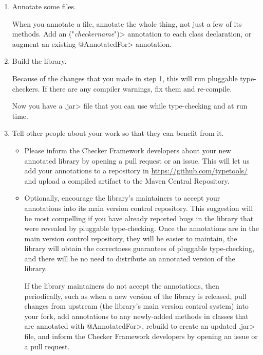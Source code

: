 \begin{enumerate}
\item Annotate some files.

  When you annotate a file, annotate the whole thing, not just a few of its
  methods.  Add an
  \<(\ttlcb"\emph{checkername}"\ttrcb)>
  annotation to each class declaration, or augment an existing \<@AnnotatedFor>
  annotation.

\item
  Build the library.

  Because of the changes that you made in step 1, this will run pluggable
  type-checkers.  If there are any compiler warnings, fix them and re-compile.

  Now you have a \<.jar> file that you can use while type-checking and at
  run time.

\item
  Tell other people about your work so that they can benefit from it.

  \begin{itemize}
  \item
    Please inform the Checker Framework developers
    about your new annotated library by opening a pull request or an issue.
    This will let us add your annotations to a repository in
    \url{https://github.com/typetools/} and upload a compiled artifact to
    the Maven Central Repository.

  \item
    Optionally, encourage the library's maintainers to accept your annotations into its
    main version control repository.  This suggestion will be most
    compelling if you have already reported bugs in the library that were
    revealed by pluggable type-checking.  Once the annotations are in the
    main version control repository, they will be easier
    to maintain, the library will obtain the correctness guarantees of
    pluggable type-checking, and there will be no need
    to distribute an annotated version of the library.

    If the library maintainers do not accept the annotations, then
    periodically, such as when a new version of the library is released,
    pull changes from upstream (the library's main version control system)
    into your fork, add annotations to any newly-added methods in classes
    that are annotated with \<@AnnotatedFor>, rebuild to create an updated
    \<.jar> file, and inform the Checker Framework developers by opening an
    issue or a pull request.
  \end{itemize}

\end{enumerate}


